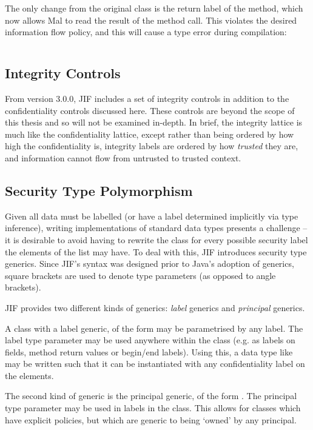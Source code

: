 The only change from the original  class is the return label of the  method, which now allows Mal to read the result of the method call. This violates the desired information flow policy, and this will cause a type error during compilation:

\inputminted[fontsize=\footnotesize]{text}{content/code_sections/jif_para_bg/DiaryError_message_jif.txt}

\subsection{Integrity Controls}

From version 3.0.0, JIF includes a set of integrity controls in addition to the confidentiality controls discussed here. These controls are beyond the scope of this thesis and so will not be examined in-depth. In brief, the integrity lattice is much like the confidentiality lattice, except rather than being ordered by how high the confidentiality is, integrity labels are ordered by how \textit{trusted} they are, and information cannot flow from untrusted to trusted context.

\subsection{Security Type Polymorphism}

Given all data must be labelled (or have a label determined implicitly via type inference), writing implementations of standard data types presents a challenge -- it is desirable to avoid having to rewrite the  class for every possible security label the elements of the list may have. To deal with this, JIF introduces security type generics. Since JIF's syntax was designed prior to Java's adoption of generics, square brackets are used to denote type parameters (as opposed to angle brackets).

JIF provides two different kinds of generics: \textit{label} generics and \textit{principal} generics.

A class with a label generic, of the form  may be parametrised by any label. The label type parameter may be used anywhere within the class (e.g. as labels on fields, method return values or begin/end labels). Using this, a data type like  may be written such that it can be instantiated with any confidentiality label on the elements.

The second kind of generic is the principal generic, of the form . The principal type parameter may be used in labels in the class. This allows for classes which have explicit policies, but which are generic to being `owned' by any principal.

